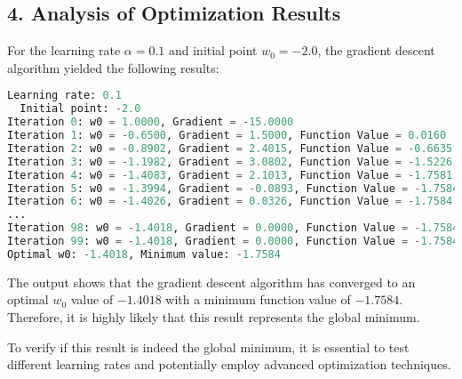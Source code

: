 \documentclass[a4paper,10pt]{article}
\begin{document}
\subsection*{4. Analysis of Optimization Results}

For the learning rate $\alpha = 0.1$ and initial point $w_0 = -2.0$, the gradient descent algorithm yielded the following results:

\begin{lstlisting}[language=Python]
Learning rate: 0.1
  Initial point: -2.0
Iteration 0: w0 = 1.0000, Gradient = -15.0000
Iteration 1: w0 = -0.6500, Gradient = 1.5000, Function Value = 0.0160
Iteration 2: w0 = -0.8902, Gradient = 2.4015, Function Value = -0.6635
Iteration 3: w0 = -1.1982, Gradient = 3.0802, Function Value = -1.5226
Iteration 4: w0 = -1.4083, Gradient = 2.1013, Function Value = -1.7581
Iteration 5: w0 = -1.3994, Gradient = -0.0893, Function Value = -1.7584
Iteration 6: w0 = -1.4026, Gradient = 0.0326, Function Value = -1.7584
...
Iteration 98: w0 = -1.4018, Gradient = 0.0000, Function Value = -1.7584
Iteration 99: w0 = -1.4018, Gradient = 0.0000, Function Value = -1.7584
Optimal w0: -1.4018, Minimum value: -1.7584
\end{lstlisting}

The output shows that the gradient descent algorithm has converged to an optimal $w_0$ value of $-1.4018$ with a minimum function value of $-1.7584$. Therefore, it is highly likely that this result represents the global minimum.

To verify if this result is indeed the global minimum, it is essential to test different learning rates and potentially employ advanced optimization techniques.
\end{document}
